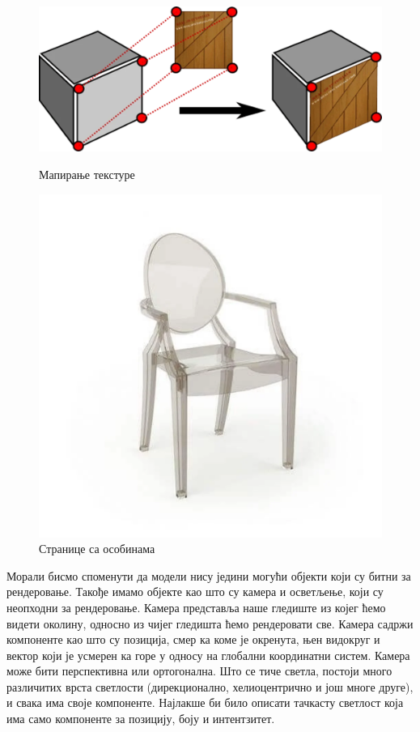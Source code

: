 \documentclass[12pt]{article}
\begin{document}
	\begin{figure}[H]
		\begin{minipage}{0.4\linewidth}
			\centering
			\includegraphics[max width=\linewidth]{slike/strukturePodatakaIzgledTehnika1.png}
			\caption{Мапирање текстуре}
			\label{fig:izgledTehnika1}
		\end{minipage}\hfill
		\begin{minipage}{0.4\linewidth}
			\centering
			\includegraphics[max width=\linewidth]{slike/strukturePodatakaIzgledTehnika2.png}
			\caption{Странице са особинама}
			\label{fig:izgledTehnika2}
		\end{minipage}
	\end{figure}

	Морали бисмо споменути да модели нису једини могући објекти који су битни за рендеровање. Такође имамо објекте као што су камера и осветљење, који су неопходни за рендеровање. Камера представља наше гледиште из којег ћемо видети околину, односно из чијег гледишта ћемо рендеровати све. Камера садржи компоненте као што су позиција, смер ка коме је окренута, њен видокруг и вектор који је усмерен ка горе у односу на глобални координатни систем. Камера може бити перспективна или ортогонална. Што се тиче светла, постоји много различитих врста светлости (дирекционално, хелиоцентрично и још многе друге), и свака има своје компоненте. Најлакше би било описати тачкасту светлост која има само компоненте за позицију, боју и интентзитет.
	
\end{document}
